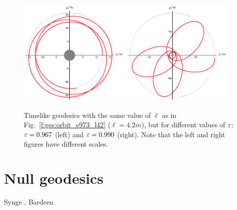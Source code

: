 \begin{figure}
\centerline{\includegraphics[width=0.48\textwidth]{ges_orbit_e967_l42.pdf}\quad
\includegraphics[width=0.48\textwidth]{ges_orbit_e990_l42.pdf}}
\caption[]{\label{f:ges:orbit_e967_990_l42} \footnotesize
Timelike geodesics with the same value of $\ell$ as in Fig.~\ref{f:ges:orbit_e973_l42} ($\ell=4.2m$), but for different values of $\varepsilon$: $\varepsilon = 0.967$ (left) and $\varepsilon=0.990$ (right).
Note that the left and right figures have different scales.
}
\end{figure}



\section{Null geodesics}


\begin{hist}
Synge \cite{Synge66}, Bardeen \cite{Barde73}
\end{hist}
